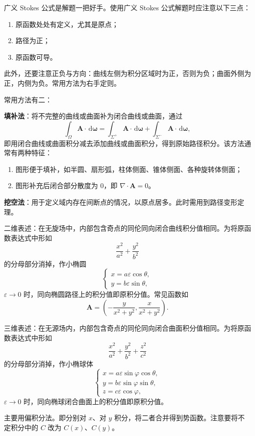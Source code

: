 \documentclass[UTF8,fontset=fandol,zihao=5]{ctexart}
\newcommand{\dd}{\,\mathrm{d}}
\let\bm\boldsymbol
\begin{document}
\begin{methodbox}
广义 Stokes 公式是解题一把好手。使用广义 Stokes 公式解题时应注意以下三点：

\begin{enumerate}
	\item 原函数处处有定义，尤其是原点；
	\item 路径为正；
	\item 原函数可导。
\end{enumerate}

此外，还要注意正负与方向：曲线左侧为积分区域时为正，否则为负；曲面外侧为正，内侧为负。常用方法为右手定则。

常用方法有二：

\textbf{填补法}：将不完整的曲线或曲面补为闭合曲线或曲面，通过
\[
\int_{\Omega}\bm A\cdot\dd\bm\omega
=\int_{\Sigma^+}\bm A\cdot\dd\bm\omega
+\int_{\Sigma^-}\bm A\cdot\dd\bm\omega,
\]
即用闭合曲线或曲面积分减去添加曲线或曲面积分，得到原始路径积分。该方法通常有两种特征：

\begin{enumerate}
	\item 图形便于填补，如半圆、扇形弧，柱体侧面、锥体侧面、各种旋转体侧面；
	\item 图形补充后闭合部分散度为 $0$，即 $\nabla\cdot\bm A=0$。
\end{enumerate}

\textbf{挖空法}：用于定义域内存在间断点的情况，以原点居多。此时需用到路径变形定理。

二维表述：在无旋场中，内部包含奇点的同伦同向闭合曲线积分值相同。为将原函数表达式中形如
\[
\frac{x^2}{a^2}+\frac{y^2}{b^2}
\]
的分母部分消掉，作小椭圆
\[
\begin{cases}
x=a\varepsilon\cos\theta,\\
y=b\varepsilon\sin\theta,
\end{cases}
\]
$\varepsilon\to0$ 时，同向椭圆路径上的积分值即原积分值。常见函数如
\[
\bm A=\left(-\frac{y}{x^2+y^2},\frac{x}{x^2+y^2}\right).
\]

三维表述：在无源场内，内部包含奇点的同伦同向闭合曲面积分值相同。为将原函数表达式中形如
\[
\frac{x^2}{a^2}+\frac{y^2}{b^2}+\frac{z^2}{c^2}
\]
的分母部分消掉，作小椭球体
\[
\begin{cases}
x=a\varepsilon\sin\varphi\cos\theta,\\
y=b\varepsilon\sin\varphi\sin\theta,\\
z=c\varepsilon\cos\varphi,
\end{cases}
\]
$\varepsilon\to0$ 时，同向椭球闭合曲面上的积分值即原积分值。
\end{methodbox}

\begin{methodbox}[由向量函数求势函数]
主要用偏积分法。即分别对 $x$、对 $y$ 积分，将二者合并得到势函数。注意要将不定积分中的 $C$ 改为 $C(x)$、$C(y)$。
\end{methodbox}
\end{document}
